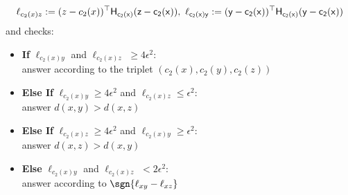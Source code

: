 \begin{algorithm}[t]
\begin{gather*}
  \ell_{c_2(x)z} := (z - c_2(x))^{\top}\sf{H}_{c_2(x)}(z - c_2(x)),\,\, \ell_{c_2(x)y} := (y - c_2(x))^{\top}\sf{H}_{c_2(x)}(y - c_2(x))    
\end{gather*}
and checks:
\begin{itemize}
    \item \textbf{If} $\ell_{c_2(x)y}$ and $\ell_{c_2(x)z}$ $\ge 4\epsilon^2$: \\
        \qquad answer according to the triplet $(c_2(x),c_2(y),c_2(z))$
    \item \textbf{Else If} $\ell_{c_2(x)y} \ge 4\epsilon^2$ and $\ell_{c_2(x)z} \le \epsilon^2$:\\
    \qquad answer $d(x,y) > d(x,z)$
    \item \textbf{Else If} $\ell_{c_2(x)z} \ge 4\epsilon^2$ and $\ell_{c_2(x)y} \ge \epsilon^2$:\\ 
    \qquad answer $d(x,z) > d(x,y)$
    \item \textbf{Else} $\ell_{c_2(x)y}$ and $\ell_{c_2(x)z}$ $< 2\epsilon^2$:\\
    \qquad answer according to $\sgn{\ell_{xy} - \ell_{xz}}$
\end{itemize}
\end{algorithm}

